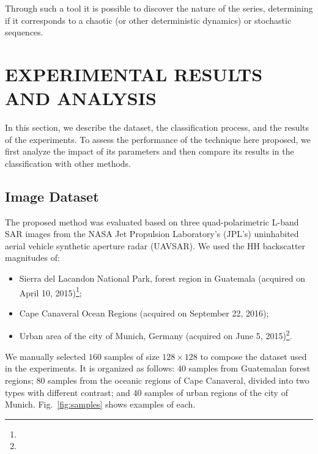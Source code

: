 \documentclass[journal]{IEEEtran}
\begin{document}
Through such a tool it is possible to discover the nature of the series, determining if it corresponds to a chaotic (or other deterministic dynamics) or stochastic sequences.

\section{EXPERIMENTAL RESULTS AND ANALYSIS}\label{Results}

In this section, we describe the dataset, 
the classification process, and 
the results of the experiments.
To assess the performance of the technique here proposed, we first analyze the impact of its parameters and then compare its results in the classification with other methods.

\subsection{Image Dataset}

The proposed method was evaluated based on three quad-polarimetric L-band SAR images from the NASA Jet Propulsion Laboratory’s (JPL’s) uninhabited aerial vehicle synthetic aperture radar (UAVSAR).
We used the HH backscatter magnitudes of:
\begin{itemize}
	\item Sierra del Lacandon National Park, forest region in Guatemala (acquired on April 10, 2015)\footnote{};
	\item Cape Canaveral Ocean Regions (acquired on September 22, 2016);
	\item Urban area of the city of Munich, Germany (acquired on June 5, 2015)\footnote{}.
\end{itemize}

We manually selected $160$ samples of size $128 \times 128$ to compose the dataset used in the experiments.
It is organized as follows:
$40$ samples from Guatemalan forest regions;
$80$ samples from the oceanic regions of Cape Canaveral, divided into two types with different contrast; and
$40$ samples of urban regions of the city of Munich.
Fig.~\ref{fig:samples} shows examples of each.

\end{document}
